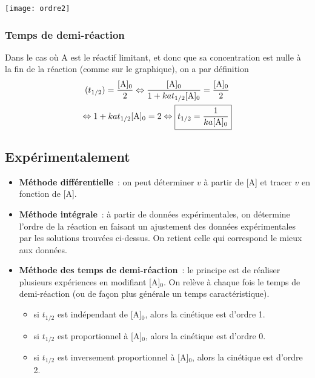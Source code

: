 \documentclass[../main/main.tex]{subfiles}
\begin{document}
\begin{center}
    \texttt{[image: ordre2]}
\end{center}

\subsubsection{Temps de demi-réaction}
Dans le cas où A est le réactif limitant, et donc que sa concentration est nulle
à la fin de la réaction (comme sur le graphique), on a par définition
\begin{gather*}
    [{\rm A}](t_{1/2}) = \frac{[{\rm A}]_0}{2}
    \Leftrightarrow
    \frac{[{\rm A}]_0}{1 + kat_{1/2}[{\rm A}]_0} = \frac{[{\rm A}]_0}{2}\\
    \Leftrightarrow
    1 + kat_{1/2}[{\rm A}]_0 = 2
    \Leftrightarrow
    \boxed{t_{1/2} = \frac{1}{ka[{\rm A}]_0}}
\end{gather*}

\subsection{Expérimentalement}
\begin{itemize}
    \item \textbf{Méthode différentielle}~: on peut déterminer $v$ à partir de
        [A] et tracer $v$ en fonction de [A].

    \item \textbf{Méthode intégrale}~: à partir de données expérimentales, on
        détermine l'ordre de la réaction en faisant un ajustement des données
        expérimentales par les solutions trouvées ci-dessus. On retient celle
        qui correspond le mieux aux données.

    \item \textbf{Méthode des temps de demi-réaction}~: le principe est de
        réaliser plusieurs expériences en modifiant [A]$_0$. On relève à chaque
        fois le temps de demi-réaction (ou de façon plus générale un temps
        caractéristique).

        \begin{itemize}
            \item si $t_{1/2}$ est indépendant de [A]$_0$, alors la cinétique
                est d'ordre 1.
            \item si $t_{1/2}$ est proportionnel à [A]$_0$, alors la cinétique
                est d'ordre 0.
            \item si $t_{1/2}$ est inversement proportionnel à [A]$_0$, alors la
                cinétique est d'ordre 2.
        \end{itemize}
\end{itemize}
\end{document}

